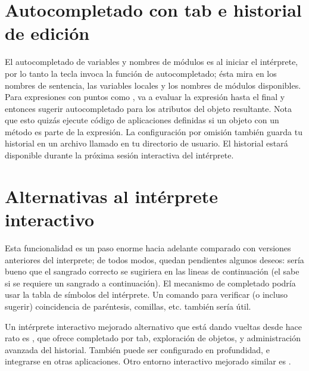 \documentclass[a4,10pt,spanish]{sphinxmanual}
\begin{document}
\section{Autocompletado con tab e historial de edición}
\label{\detokenize{tutorial/interactive:tab-completion-and-history-editing}}\label{\detokenize{tutorial/interactive:tut-keybindings}}
\sphinxAtStartPar
El autocompletado de variables y nombres de módulos es  al iniciar el intérprete, por lo tanto la tecla  invoca la función de autocompletado; ésta mira en los nombres de sentencia, las variables locales y los nombres de módulos disponibles. Para expresiones con puntos como , va a evaluar la expresión hasta el  final y entonces sugerir autocompletado para los atributos del objeto resultante. Nota que esto quizás ejecute código de aplicaciones definidas si un objeto con un método  es parte de la expresión. La configuración por omisión también guarda tu historial en un archivo llamado  en tu directorio de usuario. El historial estará disponible durante la próxima sesión interactiva del intérprete.


\section{Alternativas al intérprete interactivo}
\label{\detokenize{tutorial/interactive:alternatives-to-the-interactive-interpreter}}\label{\detokenize{tutorial/interactive:tut-commentary}}
\sphinxAtStartPar
Esta funcionalidad es un paso enorme hacia adelante comparado con versiones anteriores del interprete; de todos modos, quedan pendientes algunos deseos: sería bueno que el sangrado correcto se sugiriera en las lineas de continuación (el  sabe si se requiere un sangrado a continuación). El mecanismo de completado podría usar la tabla de símbolos del intérprete. Un comando para verificar (o incluso sugerir) coincidencia de paréntesis, comillas, etc. también sería útil.

\sphinxAtStartPar
Un intérprete interactivo mejorado alternativo que está dando vueltas desde hace rato es , que ofrece completado por tab, exploración de objetos, y administración avanzada del historial.  También puede ser configurado en profundidad, e integrarse en otras aplicaciones.  Otro entorno interactivo mejorado similar es .
\end{document}
